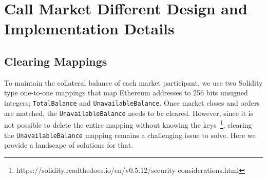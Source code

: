 \section{Call Market Different Design and Implementation Details }



\subsection{Clearing Mappings}

To maintain the collateral balance of each market participant, we use two Solidity type one-to-one mappings that map Ethereum addresses to 256 bits unsigned integers; \texttt{TotalBalance} and \texttt{UnavailableBalance}. Once market closes and orders are matched, the \texttt{UnavailableBalance} needs to be cleared. However, since it is not possible to delete the entire mapping without knowing the keys~\footnote{https://solidity.readthedocs.io/en/v0.5.12/security-considerations.html}, clearing the \texttt{UnavailableBalance} mapping remains a challenging issue to solve. Here we provide a landscape of solutions for that.


